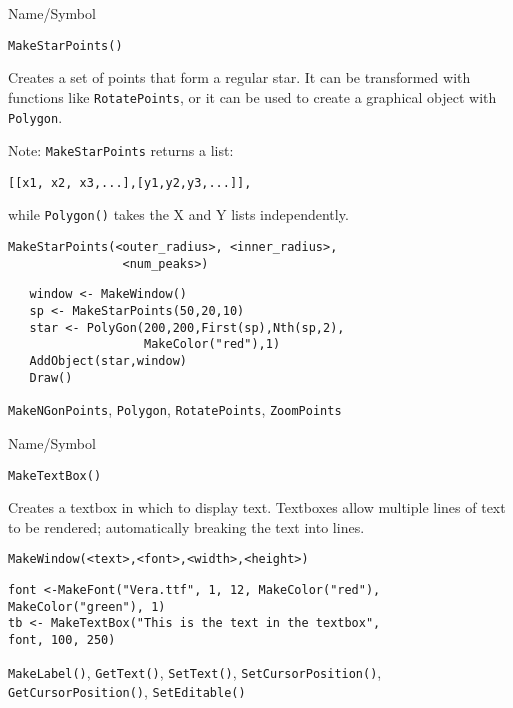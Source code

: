 \begin{desc}{Name/Symbol}
\item[Name/Symbol]	\verb+MakeStarPoints()+

\item[Description] 
Creates a set of points that form a regular star.  It can be
transformed with functions like \verb+RotatePoints+, or it can be 
used to create a graphical object with \verb+Polygon+.

Note: \verb+MakeStarPoints+ returns a list:
\begin{verbatim}
[[x1, x2, x3,...],[y1,y2,y3,...]],
\end{verbatim}
while \verb+Polygon()+ takes the X and Y lists independently.

\item[Usage]
\begin{verbatim}
MakeStarPoints(<outer_radius>, <inner_radius>,
                <num_peaks>)
\end{verbatim}

\item[Example]	
\begin{verbatim}
   window <- MakeWindow()
   sp <- MakeStarPoints(50,20,10)
   star <- PolyGon(200,200,First(sp),Nth(sp,2),
                   MakeColor("red"),1)
   AddObject(star,window)
   Draw()
\end{verbatim}

\item[See Also]	
\verb+MakeNGonPoints+, \verb+Polygon+, \verb+RotatePoints+, \verb+ZoomPoints+
\end{desc}


\begin{desc}{Name/Symbol}
\item[Name/Symbol]	\verb+MakeTextBox()+

\item[Description]	Creates a textbox in which to display text. 
		Textboxes allow multiple lines of text to be rendered;
		automatically breaking the text into lines. 

\item[Usage]
\begin{verbatim}
MakeWindow(<text>,<font>,<width>,<height>)
\end{verbatim}

\item[Example]	
\begin{verbatim}
font <-MakeFont("Vera.ttf", 1, 12, MakeColor("red"), 
MakeColor("green"), 1)
tb <- MakeTextBox("This is the text in the textbox", 
font, 100, 250)
\end{verbatim}

\item[See Also]	\verb+MakeLabel()+, \verb+GetText()+, \verb+SetText()+, \verb+SetCursorPosition()+,
		\verb+GetCursorPosition()+, \verb+SetEditable()+
\end{desc}


